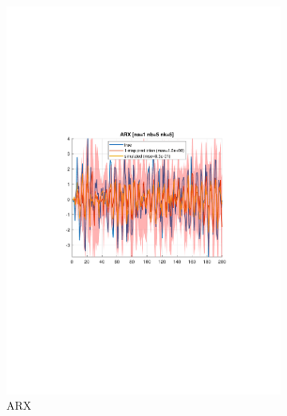\documentclass[]{article}
\begin{document}
\begin{figure}[ht]
\centering
\begin{subfigure}{.49\textwidth}
	\centering
	\includegraphics[trim= 10cm 8cm 10cm 8cm, scale=0.4]{figures/3-ARX-Ex2-idcompare.pdf}
	\caption{ARX}
	\label{fig:Ex2-idcompare-ARX}
\end{subfigure}
\begin{subfigure}{.49\textwidth}
	\centering

\end{subfigure}
\end{figure}
\end{document}

